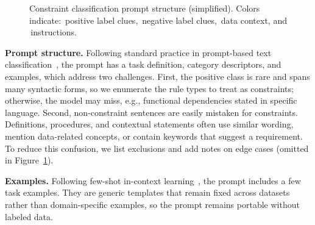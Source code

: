 \begin{figure}[!ht]
\vspace{-0.3cm}
\caption{Constraint classification prompt structure (simplified).
Colors indicate: \,positive label clues, \,negative label clues, \,data context, and \,instructions.}
\vspace{-0.3cm}
\label{fig:classifyprompt}
\end{figure}



\smallskip\noindent\textbf{Prompt structure.}
Following standard practice in prompt-based text classification~\cite{sun2023textclassification}, the prompt has a task definition, category descriptors, and examples, which address two challenges. First, the positive class is rare and spans many syntactic forms, so we enumerate the rule types to treat as constraints; otherwise, the model may miss, e.g., functional dependencies stated in specific language. 
Second, non-constraint sentences are easily mistaken for constraints. Definitions, procedures, and contextual statements often use similar wording, mention data-related concepts, or contain keywords that suggest a requirement. To reduce this confusion, we list exclusions and add notes on edge cases (omitted in Figure~\ref{fig:classifyprompt}).

\smallskip\noindent\textbf{Examples.} Following few-shot in-context learning~\cite{brown2020language}, the prompt includes a few task examples. They are generic templates that remain fixed across datasets rather than domain-specific examples, so the prompt remains portable without labeled data.

